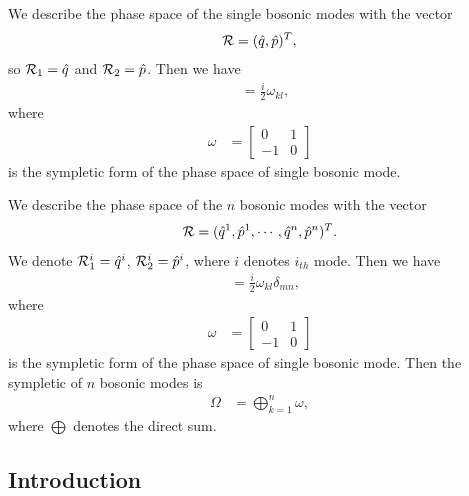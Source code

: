 \documentclass[../../note.tex]{subfiles}
\begin{document}
\begin{lemma}
    We describe the phase space of the single bosonic modes with the vector
    \begin{align}
        \mathcal{R} = (\hat{q}, \hat{p})^T,
    \end{align}
    so $\mathcal{R}_1 = \hat{q}$ and $\mathcal{R}_2 = \hat{p}$. Then we have
    \begin{align}
        [\cR_k, \cR_l]
        &= \frac{i}{2} \omega_{kl},
    \end{align}
    where 
    \begin{align}
        \omega
       &= \left[ \begin{matrix}
            0 & 1 \\
            -1 & 0
        \end{matrix}
        \right]
    \end{align}
    is the sympletic form of the phase space of single bosonic mode.
\end{lemma}

\begin{lemma}
    We describe the phase space of the $n$ bosonic modes with the vector
    \begin{align}
        \mathcal{R} = (\hat{q}^1, \hat{p}^1, \cdots, \hat{q}^n, \hat{p}^n)^T.
    \end{align}
    We denote $\mathcal{R}_1^i = \hat{q}^i$, $\mathcal{R}_2^i = \hat{p}^i$, where $i$ denotes $i_{th}$ mode. Then we have
    \begin{align}
        [\cR_k^m, \cR_l^n]
        &= \frac{i}{2} \omega_{kl} \delta_{mn},
    \end{align}
    where 
    \begin{align}
        \omega
       &= \left[ \begin{matrix}
            0 & 1 \\
            -1 & 0
        \end{matrix}
        \right]
    \end{align}
    is the sympletic form of the phase space of single bosonic mode. Then the sympletic of $n$ bosonic modes is
    \begin{align}
        \Omega
        &= \bigoplus_{k=1}^n \omega,
    \end{align}
    where $\bigoplus$ denotes the direct sum.
\end{lemma}


\subsection{Introduction}
\end{document}

